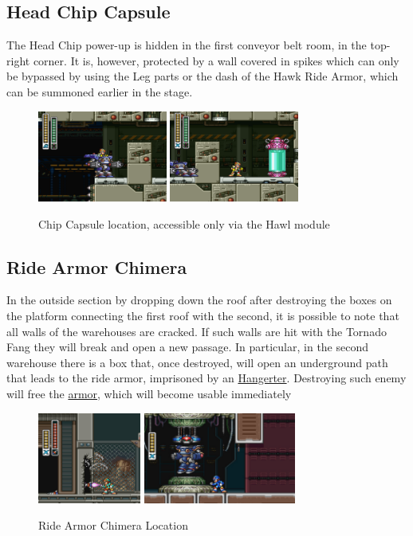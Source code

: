 \subsection{Head Chip Capsule}
The Head Chip power-up is hidden in the first conveyor belt room, in the top-right corner. It is, however, protected by a wall covered in spikes which can only be bypassed by using the Leg parts or the dash of the Hawk Ride Armor, which can be summoned earlier in the stage.
\begin{figure}[htp]
	\centering
	\includegraphics[height=3cm]{figures/X3/Blast_hornet/Armor_1.png}
	\includegraphics[height=3cm]{figures/X3/Blast_hornet/Armor_2.png}
	\caption{Chip Capsule location, accessible only via the Hawl module}
\end{figure}

\subsection{Ride Armor Chimera}
In the outside section by dropping down the roof after destroying the boxes on the platform connecting the first roof with the second, it is possible to note that all walls of the warehouses are cracked. If such walls are hit with the Tornado Fang they will break and open a new passage. In particular, in the second warehouse there is a box that, once destroyed, will open an underground path that leads to the ride armor, imprisoned by an \hyperlink{enem:Hangerter}{Hangerter}. Destroying such enemy will free the \hyperlink{vehicle:Ride_Armor_Chimera}{armor}, which will become usable immediately
\begin{figure}[htp]
	\centering
	\includegraphics[height=3cm]{figures/X3/Blast_hornet/Ride_2.jpg}
	\includegraphics[height=3cm]{figures/X3/Blast_hornet/Ride_3.jpg}
	\caption{Ride Armor Chimera Location}
\end{figure}


